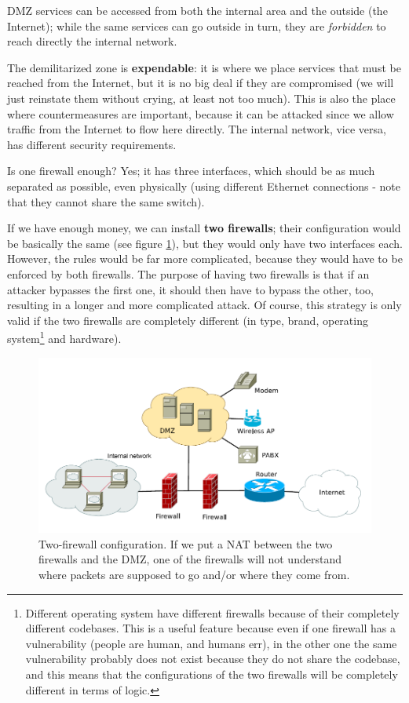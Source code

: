 DMZ services can be accessed from both the internal area and the outside (the Internet); while the same services can go outside in turn, they are \textit{forbidden} to reach directly the internal network.

The demilitarized zone is \textbf{expendable}: it is where we place services that must be reached from the Internet, but it is no big deal if they are compromised (we will just reinstate them without crying, at least not too much). This is also the place where countermeasures are important, because it can be attacked since we allow traffic from the Internet to flow here directly. The internal network, vice versa, has different security requirements.

Is one firewall enough? Yes; it has three interfaces, which should be as much separated as possible, even physically (using different Ethernet connections - note that they cannot share the same switch).

If we have enough money, we can install \textbf{two firewalls}; their configuration would be basically the same (see figure \ref{fig:two_fws}), but they would only have two interfaces each. However, the rules would be far more complicated, because they would have to be enforced by both firewalls. The purpose of having two firewalls is that if an attacker bypasses the first one, it should then have to bypass the other, too, resulting in a longer and more complicated attack. Of course, this strategy is only valid if the two firewalls are completely different (in type, brand, operating system\footnote{Different operating system have different firewalls because of their completely different codebases. This is a useful feature because even if one firewall has a vulnerability (people are human, and humans err), in the other one the same vulnerability probably does not exist because they do not share the codebase, and this means that the configurations of the two firewalls will be completely different in terms of logic.} and hardware).

\begin{figure}[h]
    \centering
    \includegraphics[scale=0.7]{img/two_fws.png}
    \decoRule
    \caption{Two-firewall configuration. If we put a NAT between the two firewalls and the DMZ, one of the firewalls will not understand where packets are supposed to go and/or where they come from.}
    \label{fig:two_fws}
\end{figure}


